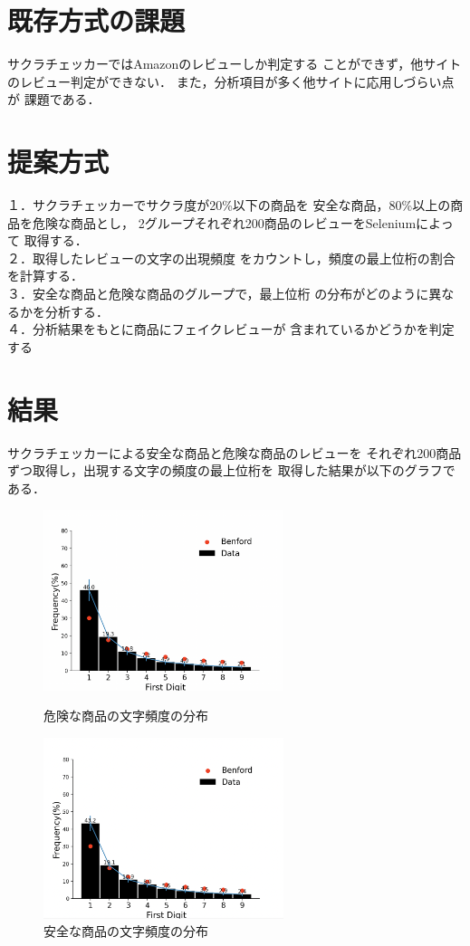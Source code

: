 \documentclass[a4paper, twocolumn]{jsarticle}
\begin{document}
\section{既存方式の課題}
サクラチェッカーではAmazonのレビューしか判定する
ことができず，他サイトのレビュー判定ができない．
また，分析項目が多く他サイトに応用しづらい点が
課題である．

\section{提案方式}
１．サクラチェッカーでサクラ度が20\%以下の商品を
安全な商品，80\%以上の商品を危険な商品とし，
2グループそれぞれ200商品のレビューをSeleniumによって
取得する．\cite{amazon}
\\２．取得したレビューの文字の出現頻度
をカウントし，頻度の最上位桁の割合を計算する．
\\３．安全な商品と危険な商品のグループで，最上位桁
の分布がどのように異なるかを分析する．
\\４．分析結果をもとに商品にフェイクレビューが
含まれているかどうかを判定する

\section{結果}
サクラチェッカーによる安全な商品と危険な商品のレビューを
それぞれ200商品ずつ取得し，出現する文字の頻度の最上位桁を
取得した結果が以下のグラフである．\\


\begin{figure}[htbp]
  \begin{center}
    \includegraphics[width=7cm]{./bad_result.png}
    \caption{危険な商品の文字頻度の分布}
    \includegraphics[width=7cm]{./good_result.png}
    \caption{安全な商品の文字頻度の分布}
  \end{center}
\end{figure}%
\end{document}
